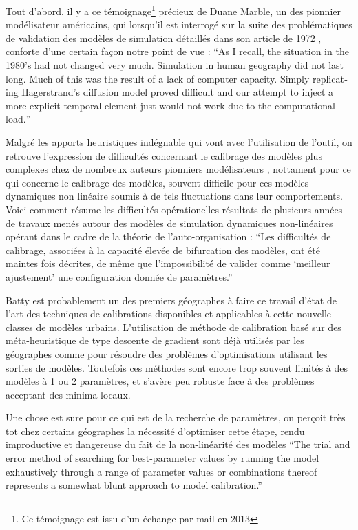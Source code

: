 Tout d'abord, il y a ce témoignage\footnote{Ce témoignage est issu d'un échange par mail en 2013} précieux de Duane Marble, un des pionnier modélisateur américains, qui lorsqu'il est interrogé sur la suite des problématiques de validation des modèles de simulation détaillés dans son article de 1972 \autocite{Marble1972}, conforte d'une certain façon notre point de vue : \foreignquote{english}{As I recall, the situation in the 1980's had not changed very much. Simulation in human geography did not last long. Much of this was the result of a lack of computer capacity. Simply replicating Hagerstrand's diffusion model proved difficult and our attempt to inject a more explicit temporal element just would not work due to the computational load.}

Malgré les apports heuristiques indégnable qui vont avec l'utilisation de l'outil, on retrouve l'expression de difficultés concernant le calibrage des modèles plus complexes chez de nombreux auteurs pionniers modélisateurs \autocite{Batty1976, Pumain1998, Sanders }, nottament pour ce qui concerne le calibrage des modèles, souvent difficile pour ces modèles dynamiques non linéaire soumis à de tels fluctuations dans leur comportements. Voici comment \autocite{Pumain1998} résume les difficultés opérationelles résultats de plusieurs années de travaux menés autour des modèles de simulation dynamiques non-linéaires opérant dans le cadre de la théorie de l'auto-organisation : \enquote{Les difficultés de calibrage, associées à la capacité élevée de bifurcation des modèles, ont été maintes fois décrites, de même que l’impossibilité de valider comme \enquote{meilleur ajustement} une configuration donnée de paramètres.}

Batty est probablement un des premiers géographes à faire ce travail d'état de l'art des techniques de calibrations disponibles et applicables à cette nouvelle classes de modèles urbains. L'utilisation de méthode de calibration basé sur des méta-heuristique de type descente de gradient sont déjà utilisés par les géographes comme \textcite[159]{Batty1976} pour résoudre des problèmes d'optimisations utilisant les sorties de modèles. Toutefois ces méthodes sont encore trop souvent limités à des modèles à 1 ou 2 paramètres, et s'avère peu robuste face à des problèmes acceptant des minima locaux. 

Une chose est sure pour ce qui est de la recherche de paramètres, on perçoit très tot chez certains géographes la nécessité d'optimiser cette étape, rendu improductive et dangereuse du fait de la non-linéarité des modèles \enquote{The trial and error method of searching for best-parameter values by running the model exhaustively through a range of parameter values or combinations thereof represents a somewhat blunt approach to model calibration.}

